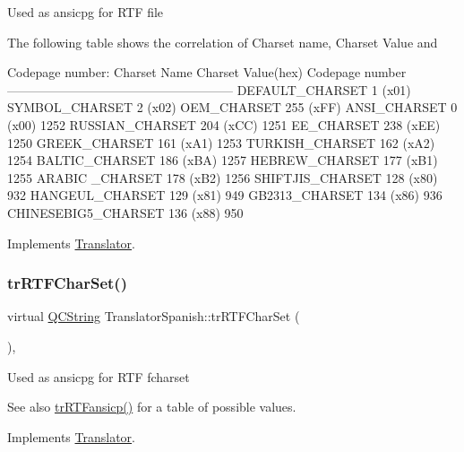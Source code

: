 Used as ansicpg for R\+TF file

The following table shows the correlation of Charset name, Charset Value and 
\begin{DoxyPre}
Codepage number:
Charset Name       Charset Value(hex)  Codepage number
------------------------------------------------------
DEFAULT\_CHARSET           1 (x01)
SYMBOL\_CHARSET            2 (x02)
OEM\_CHARSET             255 (xFF)
ANSI\_CHARSET              0 (x00)            1252
RUSSIAN\_CHARSET         204 (xCC)            1251
EE\_CHARSET              238 (xEE)            1250
GREEK\_CHARSET           161 (xA1)            1253
TURKISH\_CHARSET         162 (xA2)            1254
BALTIC\_CHARSET          186 (xBA)            1257
HEBREW\_CHARSET          177 (xB1)            1255
ARABIC \_CHARSET         178 (xB2)            1256
SHIFTJIS\_CHARSET        128 (x80)             932
HANGEUL\_CHARSET         129 (x81)             949
GB2313\_CHARSET          134 (x86)             936
CHINESEBIG5\_CHARSET     136 (x88)             950
\end{DoxyPre}
 

Implements \mbox{\hyperlink{class_translator_a9953a4c0e6a4fc7d017abcd5c2939e0f}{Translator}}.

\mbox{\label{class_translator_spanish_ae951971454f773e23ead2856a8b10f79}} 
\subsubsection{\texorpdfstring{trRTFCharSet()}{trRTFCharSet()}}
{\footnotesize\ttfamily virtual \mbox{\hyperlink{class_q_c_string}{Q\+C\+String}} Translator\+Spanish\+::tr\+R\+T\+F\+Char\+Set (\begin{DoxyParamCaption}{ }\end{DoxyParamCaption})\hspace{0.3cm}{\ttfamily [inline]}, {\ttfamily [virtual]}}

Used as ansicpg for R\+TF fcharset \begin{DoxySeeAlso}{See also}
\mbox{\hyperlink{class_translator_spanish_a4495d73fa54b58e5472b60f4b4132e3e}{tr\+R\+T\+Fansicp()}} for a table of possible values. 
\end{DoxySeeAlso}


Implements \mbox{\hyperlink{class_translator_afad391f3cbfb5ce6332b7239f8e2049a}{Translator}}.

